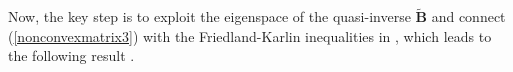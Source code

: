 \documentclass[10pt,twocolumn]{IEEEtran}
\newcommand{\0}{\mathbf{0}}
\newcommand{\1}{\mathbf{1}}
\newcommand{\trans}{^\top}
\newtheorem{lemma}{Lemma}
\newtheorem{algorithm}{Algorithm}
\begin{document}
%
%
Now, the key step is to exploit the eigenspace of the quasi-inverse $\mathbf{\tilde{B}}$ and connect (\ref{nonconvexmatrix3}) with the Friedland-Karlin inequalities in \cite{Friedland75}, which leads to the following result \cite{Tan09atech}.
\end{document}
